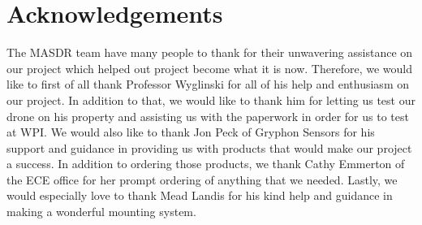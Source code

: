 \chapter{Acknowledgements}

The MASDR team have many people to thank for their unwavering assistance on our project which helped out project become what it is now.  Therefore, we would like to first of all thank Professor Wyglinski for all of his help and enthusiasm on our project.  In addition to that, we would like to thank him for letting us test our drone on his property and assisting us with the paperwork in order for us to test at WPI.  We would also like to thank Jon Peck of Gryphon Sensors for his support and guidance in providing us with products that would make our project a success.  In addition to ordering those products, we thank Cathy Emmerton of the ECE office for her prompt ordering of anything that we needed.  Lastly, we would especially love to thank Mead Landis for his kind help and guidance in making a wonderful mounting system.
